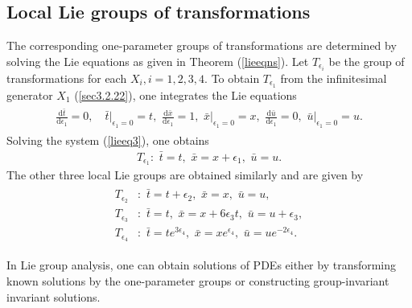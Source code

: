\subsection{Local Lie groups of transformations}
The corresponding one-parameter groups of transformations are determined by solving the Lie equations as given in Theorem (\ref{lieeqns}). Let $T_{\epsilon_i}$  be the group of transformations  for each $X_i, i =1,2,3,4. $   To obtain  $T_{\epsilon_1}$ from the infinitesimal generator $X_1$ (\ref{sec3.2.22}), one integrates the Lie equations
\begin{align} \begin{aligned}
\frac{\mathrm{d} \bar{t} }{ \mathrm{d} \epsilon_1 } = 0,\quad \bar{t}\Big |_{ \epsilon_1 =0} =t, \,\,
\frac{ \mathrm{d} \bar{x}}{ \mathrm{d}\epsilon_1} =1,\,\, \bar{x}\Big |_{ \epsilon_1 =0} =x, \,\,
\frac{ \mathrm{d} \bar{u}}{ \mathrm{d}\epsilon_1} = 0,\,\, \bar{u}\Big |_{ \epsilon_1 =0} =u.
\label{lieeq3} \end{aligned}
\end{align}
Solving the  system (\ref{lieeq3}), one obtains
\begin{align} T_{\epsilon_1} : \,\,\bar{t}=t,\,\,  \bar{x}=x + \epsilon_1,\,\, \bar{u} =u. \label{sec3.1.14}
\end{align}
The other three local Lie  groups are obtained similarly and are given by
\begin{align} \begin{aligned}
T_{\epsilon_2} &: \,\,  \bar{t} = t+\epsilon_2,\,\,  \bar{x}=x,\,\,  \bar{u}=u, \\
T_{\epsilon_3} &:\,\,  \bar{t}=t, \,\, \bar{x}=x + 6\epsilon_3t,\,\,  \bar{u}=u+ \epsilon_3,\\
T_{\epsilon_4} &:\,\,  \bar{t}=t e^{3 \epsilon_4}, \,\, \bar{x}=x e^{\epsilon_4},\,\, \bar{u} =ue^{-2\epsilon_4}.
\label{sec3.1.15} 
\end{aligned}
\end{align}
\begin{rem}
 In Lie group analysis, one can obtain solutions of PDEs either by transforming known solutions by the one-parameter groups or constructing group-invariant invariant solutions. 
\end{rem}
